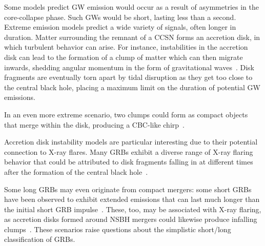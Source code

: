 Some models predict GW emission would occur as a result of asymmetries in the core-collapse phase.
Such \acp{GW} would be short, lasting less than a second.
Extreme emission models predict a wide variety of signals, often longer in duration.
Matter surrounding the remnant of a \ac{CCSN} forms an accretion disk, in which turbulent behavior can arise.
For instance, instabilities in the accretion disk can lead to the formation of a clump of matter which can then migrate inwards, shedding angular momentum in the form of gravitational waves~\citep{Piro_2007}.
Disk fragments are eventually torn apart by tidal disruption as they get too close to the central black hole, placing a maximum limit on the duration of potential GW emissions.

In an even more extreme scenario, two clumps could form as compact objects that merge within the disk, producing a CBC-like chirp~\citep{vanPutten_2001, vanPutten_2004}.

Accretion disk instability models are particular interesting due to their potential connection to X-ray flares.
Many GRBs exhibit a diverse range of X-ray flaring behavior that could be attributed to disk fragments falling in at different times after the formation of the central black hole~\citep{Dallosso_2017}.

Some long GRBs may even originate from compact mergers: some short GRBs have been observed to exhibit extended emissions that can last much longer than the initial short GRB impulse~\citep{Norris_2006, vanPutten_2014}.
These, too, may be associated with X-ray flaring, as accretion disks formed around NSBH mergers could likewise produce infalling clumps~\citep{Mu_2018}.
These scenarios raise questions about the simplistic short/long classification of GRBs.






